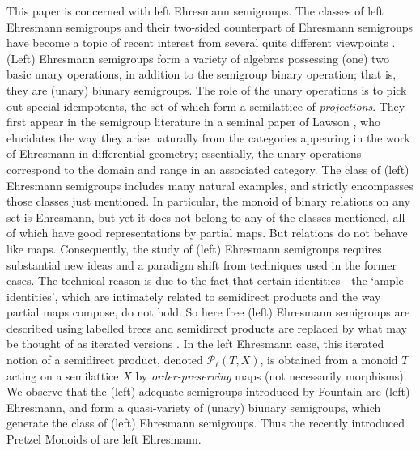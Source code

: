 \documentclass[12pt]{amsart}
\theoremstyle{definition}
\theoremstyle{definition}
\numberwithin{them}{section}
\numberwithin{equation}{section}
\begin{document}
This paper is concerned with left Ehresmann semigroups.   The classes of left  Ehresmann semigroups and their two-sided counterpart of Ehresmann semigroups have become a topic of recent interest from several quite different viewpoints \cite{EG, MS, stokes:21, L, KL}.  (Left) Ehresmann  semigroups form a variety of algebras possessing (one) two basic unary operations, in addition to the semigroup binary operation; that is, they are (unary) biunary semigroups. The role of the unary operations is to pick out special idempotents, the set of which form a semilattice of {\em projections}. They  first appear in the semigroup literature in a seminal paper of Lawson \cite{lawson:1991},  who elucidates the way they arise  naturally from the categories appearing in the work of Ehresmann  in differential geometry; essentially, the unary operations correspond to the domain and range in an associated category. The class of (left) Ehresmann semigroups  includes many natural examples, and strictly encompasses those classes just mentioned. In particular, the monoid of binary relations on any set is Ehresmann, but yet it does not belong to any of the classes mentioned, all of which have good representations by partial maps. But relations do not behave like maps. Consequently, the study of (left) Ehresmann semigroups requires substantial new ideas and a paradigm shift from techniques used in the former cases. The technical reason is due to the fact that certain identities - the `ample identities', which are intimately related to semidirect products and the way partial maps compose, do not hold. So here free (left) Ehresmann semigroups are described using  labelled trees \cite{K1, K2} and  semidirect products  are replaced by what may be thought of as iterated versions \cite{BGG, BGG2, BGGW}. In the left Ehresmann case, this iterated notion of a semidirect product, denoted $\mathcal{P}_{\ell}(T,X)$, is obtained from a monoid $T$ acting  on a semilattice $X$ by {\em order-preserving} maps (not necessarily morphisms).
We observe that the (left) adequate semigroups introduced by Fountain \cite{F1} are (left) Ehresmann, and form a quasi-variety of (unary) biunary semigroups, which generate the class of (left) Ehresmann semigroups. Thus the recently introduced Pretzel Monoids of \cite{HKS} are left Ehresmann.
\end{document}
